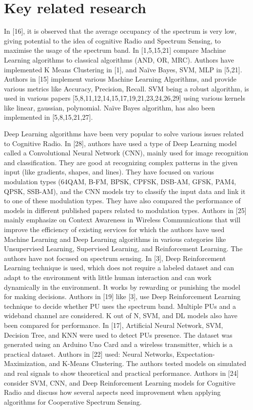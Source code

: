 \section{Key related research}
In [16], it is observed that the average occupancy of the spectrum is very low, giving potential to the idea of cognitive Radio and Spectrum Sensing, to maximise the usage of the spectrum band. In [1,5,15,21] compare Machine Learning algorithms to classical algorithms (AND, OR, MRC). Authors have implemented K Means Clustering in [1], and Naïve Bayes, SVM, MLP in [5,21]. Authors in [15] implement various Machine Learning Algorithms, and provide various metrics like Accuracy, Precision, Recall. SVM being a robust algorithm, is used in various papers [5,8,11,12,14,15,17,19,21,23,24,26,29] using various kernels like linear, gaussian, polynomial. Naïve Bayes algorithm, has also been implemented in [5,8,15,21,27]. 

Deep Learning algorithms have been very popular to solve various issues related to Cognitive Radio. In [28], authors have used a type of Deep Learning model called a Convolutional Neural Network (CNN), mainly used for image recognition and classification. They are good at recognizing complex patterns in the given input (like gradients, shapes, and lines). They have focused on various modulation types (64QAM, B-FM, BPSK, CPFSK, DSB-AM, GFSK, PAM4, QPSK, SSB-AM), and the CNN models try to classify the input data and link it to one of these modulation types. They have also compared the performance of models in different published papers related to modulation types. Authors in [25] mainly emphasize on Context Awareness in Wireless Communications that will improve the efficiency of existing services for which the authors have used Machine Learning and Deep Learning algorithms in various categories like Unsupervised Learning, Supervised Learning, and Reinforcement Learning. The authors have not focused on spectrum sensing. In [3], Deep Reinforcement Learning technique is used, which does not require a labeled dataset and can adapt to the environment with little human interaction and can work dynamically in the environment. It works by rewarding or punishing the model for making decisions. Authors in [19] like [3], use Deep Reinforcement Learning technique to decide whether PU uses the spectrum band. Multiple PUs and a wideband channel are considered. K out of N, SVM, and DL models also have been compared for performance. In [17], Artificial Neural Network, SVM, Decision Tree, and KNN were used to detect PUs presence. The dataset was generated using an Arduino Uno Card and a wireless transmitter, which is a practical dataset. Authors in [22] used: Neural Networks, Expectation-Maximization, and K-Means Clustering. The authors tested models on simulated and real signals to show theoretical and practical performance. Authors in [24] consider SVM, CNN, and Deep Reinforcement Learning models for Cognitive Radio and discuss how several aspects need improvement when applying algorithms for Cooperative Spectrum Sensing.

